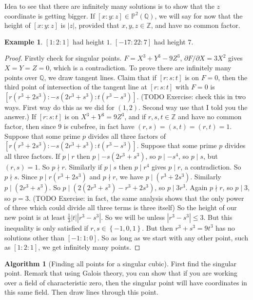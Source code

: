 \documentclass{article}
\newcommand{\Z}{\mathbb{Z}}
\newcommand{\Q}{\mathbb{Q}}
\renewcommand{\P}{\mathbb{P}}
\newcommand{\rb}[1]{\left( #1 \right)}
\renewcommand{\sb}[1]{\left[ #1 \right]}
\newcommand{\cb}[1]{\left\{ #1 \right\}}
\newcommand{\abs}[1]{\left\lvert #1 \right\rvert}
\theoremstyle{definition}\newtheorem{definition}{Definition}[section]
\theoremstyle{definition}\newtheorem{remark}[definition]{Remark}
\theoremstyle{definition}\newtheorem*{example}{Example}
\theoremstyle{definition}\newtheorem*{note}{Note}
\newtheorem{algorithm}[definition]{Algorithm}
\begin{document}
Idea to see that there are infinitely many solutions is to show that the $ z $ coordinate is getting bigger. If $ \sb{x : y : z} \in \P^2\rb{\Q} $, we will say for now that the height of $ \sb{x : y : z} $ is $ \abs{z} $, provided that $ x, y, z \in \Z $, and have no common factor.

\begin{example}
$ \sb{1 : 2 : 1} $ had height $ 1 $. $ \sb{-17 : 22 : 7} $ had height $ 7 $.
\end{example}

\begin{proof}
Firstly check for singular points. $ F = X^3 + Y^3 - 9Z^3 $, $ \partial F / \partial X = 3X^2 $ gives $ X = Y = Z = 0 $, which is a contradiction. To prove there are infinitely many points over $ \Q $, we draw tangent lines. Claim that if $ \sb{r : s : t} $ is on $ F = 0 $, then the third point of intersection of the tangent line at $ \sb{r : s : t} $ with $ F = 0 $ is $ \sb{r\rb{r^3 + 2s^3} : -s\rb{2r^3 + s^3} : t\rb{r^3 - s^3}} $. (TODO Exercise: check this in two ways. First way do this as we did for $ \rb{1, 2} $. Second way use that I told you the answer.) If $ \sb{r : s : t} $ is on $ X^3 + Y^3 = 9Z^3 $, and if $ r, s, t \in \Z $ and have no common factor, then since $ 9 $ is cubefree, in fact have $ \rb{r, s} = \rb{s, t} = \rb{r, t} = 1 $. Suppose that some prime $ p $ divides all three factors of $ \sb{r\rb{r^3 + 2s^3} : -s\rb{2r^3 + s^3} : t\rb{r^3 - s^3}} $. Suppose that some prime $ p $ divides all three factors. If $ p \mid r $ then $ p \mid -s\rb{2r^3 + s^3} $, so $ p \mid -s^4 $, so $ p \mid s $, but $ \rb{r, s} = 1 $. So $ p \nmid r $. Similarly if $ p \mid s $ then $ p \mid r^4 $ gives $ p \mid r $, a contradiction. So $ p \nmid s $. Since $ p \mid r\rb{r^3 + 2s^3} $ and $ p \nmid r $, we have $ p \mid \rb{r^3 + 2s^3} $. Similarly $ p \mid \rb{2r^3 + s^3} $. So $ p \mid \rb{2\rb{2r^3 + s^3} - r^3 + 2s^3} $, so $ p \mid 3r^3 $. Again $ p \nmid r $, so $ p \mid 3 $, so $ p = 3 $. (TODO Exercise: in fact, the same analysis shows that the only power of three which could divide all three terms is three itself) So the height of our new point is at least $ \tfrac{1}{3}\abs{t}\abs{r^3 - s^3} $. So we will be unless $ \abs{r^3 - s^3} \le 3 $. But this inequality is only satisfied if $ r, s \in \cb{-1, 0, 1} $. But then $ r^3 + s^3 = 9t^3 $ has no solutions other than $ \sb{-1 : 1 : 0} $. So as long as we start with any other point, such as $ \sb{1 : 2 : 1} $, we get infinitely many points.
\end{proof}

\begin{algorithm}[Finding all points for a singular cubic]
First find the singular point. Remark that using Galois theory, you can show that if you are working over a field of characteristic zero, then the singular point will have coordinates in this same field. Then draw lines through this point.
\end{algorithm}
\end{document}
